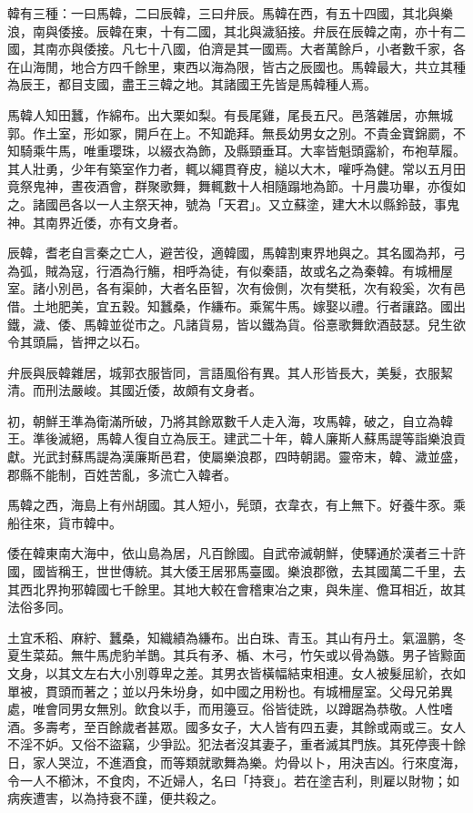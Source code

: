 \begin{pinyinscope}
韓有三種：一曰馬韓，二曰辰韓，三曰弁辰。馬韓在西，有五十四國，其北與樂浪，南與倭接。辰韓在東，十有二國，其北與濊貊接。弁辰在辰韓之南，亦十有二國，其南亦與倭接。凡七十八國，伯濟是其一國焉。大者萬餘戶，小者數千家，各在山海閒，地合方四千餘里，東西以海為限，皆古之辰國也。馬韓最大，共立其種為辰王，都目支國，盡王三韓之地。其諸國王先皆是馬韓種人焉。

馬韓人知田蠶，作綿布。出大栗如梨。有長尾雞，尾長五尺。邑落雜居，亦無城郭。作土室，形如冢，開戶在上。不知跪拜。無長幼男女之別。不貴金寶錦罽，不知騎乘牛馬，唯重瓔珠，以綴衣為飾，及縣頸垂耳。大率皆魁頭露紒，布袍草履。其人壯勇，少年有築室作力者，輒以繩貫脊皮，縋以大木，嚾呼為健。常以五月田竟祭鬼神，晝夜酒會，群聚歌舞，舞輒數十人相隨蹋地為節。十月農功畢，亦復如之。諸國邑各以一人主祭天神，號為「天君」。又立蘇塗，建大木以縣鈴鼓，事鬼神。其南界近倭，亦有文身者。

辰韓，耆老自言秦之亡人，避苦役，適韓國，馬韓割東界地與之。其名國為邦，弓為弧，賊為寇，行酒為行觴，相呼為徒，有似秦語，故或名之為秦韓。有城柵屋室。諸小別邑，各有渠帥，大者名臣智，次有儉側，次有樊秖，次有殺奚，次有邑借。土地肥美，宜五穀。知蠶桑，作縑布。乘駕牛馬。嫁娶以禮。行者讓路。國出鐵，濊、倭、馬韓並從巿之。凡諸貨易，皆以鐵為貨。俗憙歌舞飲酒鼓瑟。兒生欲令其頭扁，皆押之以石。

弁辰與辰韓雜居，城郭衣服皆同，言語風俗有異。其人形皆長大，美髮，衣服絜清。而刑法嚴峻。其國近倭，故頗有文身者。

初，朝鮮王準為衛滿所破，乃將其餘眾數千人走入海，攻馬韓，破之，自立為韓王。準後滅絕，馬韓人復自立為辰王。建武二十年，韓人廉斯人蘇馬諟等詣樂浪貢獻。光武封蘇馬諟為漢廉斯邑君，使屬樂浪郡，四時朝謁。靈帝末，韓、濊並盛，郡縣不能制，百姓苦亂，多流亡入韓者。

馬韓之西，海島上有州胡國。其人短小，髡頭，衣韋衣，有上無下。好養牛豕。乘船往來，貨市韓中。

倭在韓東南大海中，依山島為居，凡百餘國。自武帝滅朝鮮，使驛通於漢者三十許國，國皆稱王，世世傳統。其大倭王居邪馬臺國。樂浪郡徼，去其國萬二千里，去其西北界拘邪韓國七千餘里。其地大較在會稽東冶之東，與朱崖、儋耳相近，故其法俗多同。

土宜禾稻、麻紵、蠶桑，知織績為縑布。出白珠、青玉。其山有丹土。氣溫鹏，冬夏生菜茹。無牛馬虎豹羊鵲。其兵有矛、楯、木弓，竹矢或以骨為鏃。男子皆黥面文身，以其文左右大小別尊卑之差。其男衣皆橫幅結束相連。女人被髮屈紒，衣如單被，貫頭而著之；並以丹朱坋身，如中國之用粉也。有城柵屋室。父母兄弟異處，唯會同男女無別。飲食以手，而用籩豆。俗皆徒跣，以蹲踞為恭敬。人性嗜酒。多壽考，至百餘歲者甚眾。國多女子，大人皆有四五妻，其餘或兩或三。女人不淫不妒。又俗不盜竊，少爭訟。犯法者沒其妻子，重者滅其門族。其死停喪十餘日，家人哭泣，不進酒食，而等類就歌舞為樂。灼骨以卜，用決吉凶。行來度海，令一人不櫛沐，不食肉，不近婦人，名曰「持衰」。若在塗吉利，則雇以財物；如病疾遭害，以為持衰不謹，便共殺之。


\end{pinyinscope}
